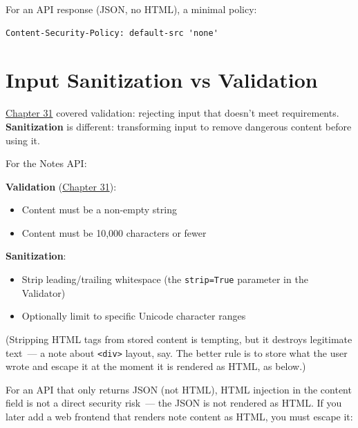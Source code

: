\noindent{}For an API response (JSON, no HTML), a minimal policy:

\begin{outputbox}[short]
\begin{Verbatim}[fontsize=\codesize, breaklines, breakanywhere, breaksymbolleft={\tiny\textcolor{muted}{$\hookrightarrow$}}]
Content-Security-Policy: default-src 'none'
\end{Verbatim}
\end{outputbox}

\setcounter{section}{7}
\section{Input Sanitization vs Validation}\label{38-security:388-input-sanitization-vs-validation}

\hyperref[ch:31-input-handling]{Chapter 31} covered validation: rejecting input that doesn't meet requirements. \textbf{Sanitization} is different: transforming input to remove dangerous content before using it.

For the Notes API:

\textbf{Validation} (\hyperref[ch:31-input-handling]{Chapter 31}):

\begin{itemize}
\tightlist
\item
  Content must be a non-empty string
\item
  Content must be 10,000 characters or fewer
\end{itemize}

\noindent{}\textbf{Sanitization}:

\begin{itemize}
\tightlist
\item
  Strip leading/trailing whitespace (the \texttt{strip=True} parameter in the Validator)
\item
  Optionally limit to specific Unicode character ranges
\end{itemize}

\noindent{}(Stripping HTML tags from stored content is tempting, but it destroys legitimate text~--- a note about \texttt{\textless{}div\textgreater{}} layout, say. The better rule is to store what the user wrote and escape it at the moment it is rendered as HTML, as below.)

For an API that only returns JSON (not HTML), HTML injection in the content field is not a direct security risk~--- the JSON is not rendered as HTML. If you later add a web frontend that renders note content as HTML, you must escape it:

